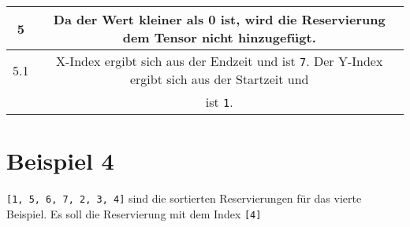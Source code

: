 \begin{table}[H]
    \centering
    \begin{tabular}{|c|c|}
        \hline
        5 & Da der Wert kleiner als 0 ist, wird die Reservierung dem Tensor nicht hinzugefügt. \\ \hline
        5.1 & X-Index ergibt sich aus der Endzeit und ist \texttt{7}.  Der Y-Index ergibt sich aus der Startzeit und \\& ist \texttt{1}. \\ \hline
    \end{tabular}
\end{table}

\section{Beispiel 4}
\texttt{[1, 5, 6, 7, 2, 3, 4]} sind die sortierten Reservierungen für das vierte Beispiel. Es soll die Reservierung mit dem Index \texttt{[4]} 

